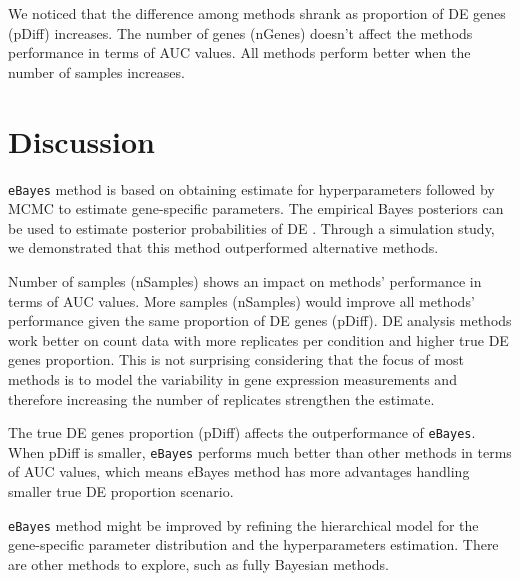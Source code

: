 We noticed that the difference among methods shrank as proportion of DE genes (pDiff) increases. The number of genes (nGenes) doesn't affect the methods performance in terms of AUC values. All methods perform better when the number of samples increases.


\section{Discussion}

{\tt eBayes} method is based on obtaining estimate for hyperparameters followed by MCMC to estimate gene-specific parameters. The empirical Bayes posteriors can be used to estimate posterior probabilities of DE . Through a simulation study, we demonstrated that this method outperformed alternative methods. 

Number of samples (nSamples) shows an impact on methods' performance in terms of AUC values. More samples (nSamples) would improve all methods' performance given the same proportion of DE genes (pDiff). DE analysis methods work better on count data with more replicates per condition and higher true DE genes proportion. This is not surprising considering that the focus of most methods is to model the variability in gene expression measurements and therefore increasing the number of replicates strengthen the estimate. 

The true DE genes proportion (pDiff) affects the outperformance of {\tt eBayes}. When pDiff is smaller, {\tt eBayes} performs much better than other methods in terms of AUC values, which means eBayes method has more advantages handling smaller true DE proportion scenario.

{\tt eBayes} method might be improved by refining the hierarchical model for the gene-specific parameter distribution and the hyperparameters estimation. There are other methods to explore, such as fully Bayesian methods. 




